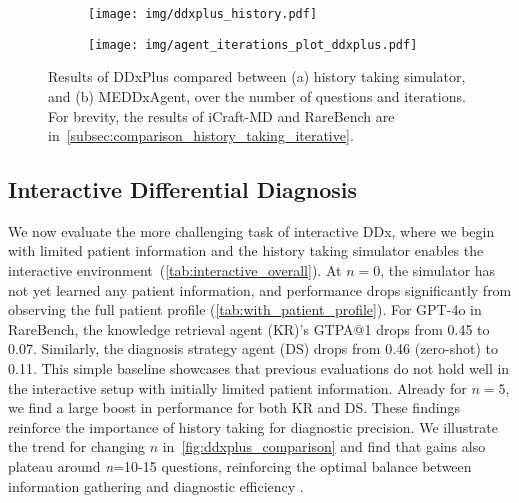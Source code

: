 \begin{figure*}[t]
    \centering
    \begin{subfigure}{0.48\textwidth}
    \texttt{[image: img/ddxplus\_history.pdf]}
    \vspace{-1.8em}
    \caption{}
    \end{subfigure}
    \begin{subfigure}{0.48\textwidth}
    \texttt{[image: img/agent\_iterations\_plot\_ddxplus.pdf]}
    \vspace{-1.8em}
    \caption{}
    \end{subfigure}
    \vspace{-0.5em}
    \caption{Results of DDxPlus compared between (a) history taking simulator, and (b) MEDDxAgent, over the number of questions and iterations. For brevity, the results of iCraft-MD and RareBench are in~\autoref{subsec:comparison_history_taking_iterative}.}
    \label{fig:ddxplus_comparison}
    \vspace{-1.8em}
\end{figure*}

\subsection{Interactive Differential Diagnosis}
\label{subsec:interactive_differential_diagnosis}
We now evaluate the more challenging task of interactive DDx, where we begin with limited patient information and the history taking simulator enables the interactive environment~(\autoref{tab:interactive_overall}).
At $n=0$, the simulator has not yet learned any patient information, and performance drops significantly from observing the full patient profile (\autoref{tab:with_patient_profile}). 
For GPT-4o in RareBench, the knowledge retrieval agent (KR)'s GTPA@1 drops from 0.45  to 0.07. Similarly, the diagnosis strategy agent (DS) drops from 0.46 (zero-shot) to 0.11. This simple baseline showcases that previous evaluations do not hold well in the interactive setup with initially limited patient information. 
Already for $n=5$, we find a large boost in performance for both KR and DS. These findings reinforce the importance of history taking for diagnostic precision. 
We illustrate the trend for changing $n$ in~\autoref{fig:ddxplus_comparison} and find that gains also plateau around \textit{n}=10-15 questions, reinforcing the optimal balance between information gathering and diagnostic efficiency \cite{ely1999analysis}.

